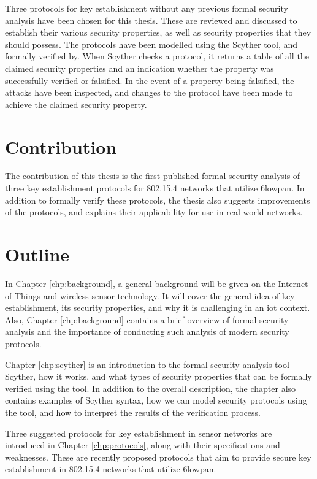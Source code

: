 Three protocols for key establishment without any previous formal security analysis have been chosen for this thesis. These are reviewed and discussed to establish their various security properties, as well as security properties that they should possess. The protocols have been modelled using the Scyther tool, and formally verified by. When Scyther checks a protocol, it returns a table of all the claimed security properties and an indication whether the property was successfully verified or falsified. In the event of a property being falsified, the attacks have been inspected, and changes to the protocol have been made to achieve the claimed security property. 

\section{Contribution}

The contribution of this thesis is the first published formal security analysis of three key establishment protocols for 802.15.4 networks that utilize \gls{6lowpan}. In addition to formally verify these protocols, the thesis also suggests improvements of the protocols, and explains their applicability for use in real world networks.


\section{Outline}

In Chapter \ref{chp:background}, a general background will be given on the Internet of Things and wireless sensor technology. It will cover the general idea of key establishment, its security properties, and why it is challenging in an \gls{iot} context. Also, Chapter \ref{chp:background} contains a brief overview of formal security analysis and the importance of conducting such analysis of modern security protocols.

Chapter \ref{chp:scyther} is an introduction to the formal security analysis tool Scyther, how it works, and what types of security properties that can be formally verified using the tool. In addition to the overall description, the chapter also contains examples of Scyther syntax, how we can model security protocols using the tool, and how to interpret the results of the verification process.

Three suggested protocols for key establishment in sensor networks are introduced in Chapter \ref{chp:protocols}, along with their specifications and weaknesses. These are recently proposed protocols that aim to provide secure key establishment in 802.15.4 networks that utilize \gls{6lowpan}.

